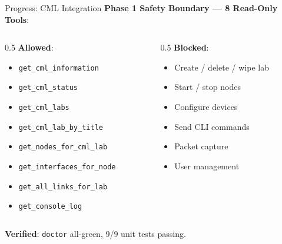 \documentclass[11pt,aspectratio=169]{beamer}
\begin{document}
\begin{frame}{Progress: CML Integration}
  \textbf{Phase 1 Safety Boundary --- 8 Read-Only Tools}:

  \vspace{4pt}
  \begin{columns}[t]
    \begin{column}{0.5\textwidth}
      \textbf{Allowed}:
      \begin{itemize}
        \item \texttt{get\_cml\_information}
        \item \texttt{get\_cml\_status}
        \item \texttt{get\_cml\_labs}
        \item \texttt{get\_cml\_lab\_by\_title}
        \item \texttt{get\_nodes\_for\_cml\_lab}
        \item \texttt{get\_interfaces\_for\_node}
        \item \texttt{get\_all\_links\_for\_lab}
        \item \texttt{get\_console\_log}
      \end{itemize}
    \end{column}
    \begin{column}{0.5\textwidth}
      \textbf{Blocked}:
      \begin{itemize}
        \item Create / delete / wipe lab
        \item Start / stop nodes
        \item Configure devices
        \item Send CLI commands
        \item Packet capture
        \item User management
      \end{itemize}
    \end{column}
  \end{columns}

  \vspace{8pt}
  \textbf{Verified}: \texttt{doctor} all-green, 9/9 unit tests passing.
\end{frame}
\end{document}
